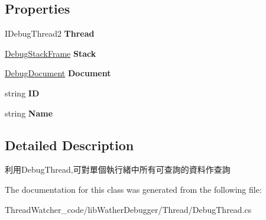 \subsection*{Properties}
\begin{DoxyCompactItemize}
\item 
\hypertarget{classlib_wather_debugger_1_1_thread_1_1_debug_thread_a00f4c7d687cab9a01e3f4028af437fc2}{I\+Debug\+Thread2 {\bfseries Thread}}\label{classlib_wather_debugger_1_1_thread_1_1_debug_thread_a00f4c7d687cab9a01e3f4028af437fc2}

\item 
\hypertarget{classlib_wather_debugger_1_1_thread_1_1_debug_thread_a234def855a5ce2c6afd2fc8bcf1b54cf}{\hyperlink{classlib_wather_debugger_1_1_stack_1_1_debug_stack_frame}{Debug\+Stack\+Frame} {\bfseries Stack}}\label{classlib_wather_debugger_1_1_thread_1_1_debug_thread_a234def855a5ce2c6afd2fc8bcf1b54cf}

\item 
\hypertarget{classlib_wather_debugger_1_1_thread_1_1_debug_thread_a538776b6e4cd0aa199f37c11312bbc5e}{\hyperlink{classlib_wather_debugger_1_1_document_context_1_1_debug_document}{Debug\+Document} {\bfseries Document}}\label{classlib_wather_debugger_1_1_thread_1_1_debug_thread_a538776b6e4cd0aa199f37c11312bbc5e}

\item 
\hypertarget{classlib_wather_debugger_1_1_thread_1_1_debug_thread_a1a163243239ba3a4911e9a271c87d6ff}{string {\bfseries I\+D}}\label{classlib_wather_debugger_1_1_thread_1_1_debug_thread_a1a163243239ba3a4911e9a271c87d6ff}

\item 
\hypertarget{classlib_wather_debugger_1_1_thread_1_1_debug_thread_acdca66c8e4206d2703cde8f06694bfce}{string {\bfseries Name}}\label{classlib_wather_debugger_1_1_thread_1_1_debug_thread_acdca66c8e4206d2703cde8f06694bfce}

\end{DoxyCompactItemize}


\subsection{Detailed Description}
利用\+Debug\+Thread,可對單個執行緒中所有可查詢的資料作查詢 



The documentation for this class was generated from the following file\+:\begin{DoxyCompactItemize}
\item 
Thread\+Watcher\+\_\+code/lib\+Wather\+Debugger/\+Thread/Debug\+Thread.\+cs\end{DoxyCompactItemize}
